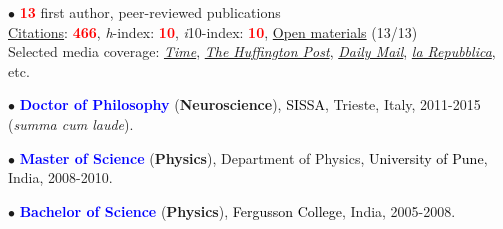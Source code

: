 \documentclass[10pt]{article}
\begin{document}
	
	

	
	$\bullet$ \textbf{\textcolor{red}{13}} first author, peer-reviewed publications\\
	\hspace*{0.1in}\href{https://scholar.google.it/citations?user=kSYuYTUAAAAJ&hl=en&oi=ao}{Citations}: \textbf{\textcolor{red}{466}}, \textit{h}-index: \textbf{\textcolor{red}{10}}, \textit{i}10-index: \textbf{\textcolor{red}{10}}, \href{https://osf.io/hk5f3/}{Open materials} (13/13)\\
	\hspace*{0.1in}Selected media coverage: \href{http://time.com/3242/driving-over-your-best-friend-its-the-right-thing-to-do/}{\textit{Time}}, \href{http://www.huffingtonpost.com/entry/autism-empathy-brain-research_us_56f92575e4b014d3fe237413}{\textit{The Huffington Post}}, \href{http://www.dailymail.co.uk/sciencetech/article-4308284/Virtual-reality-experiment-puts-altruism-test.html}{\textit{Daily Mail}}, \href{http://www.repubblica.it/scienze/2017/04/11/news/area_cervello_perdono-162669836/?rss}{\textit{la Repubblica}}, etc.

	
	$\bullet$ \textbf{\textcolor{blue}{Doctor of Philosophy}} (\textbf{Neuroscience}), \textcolor{black}{SISSA}, Trieste, Italy, 2011-2015 (\textit{summa cum laude}).\\ 
	 \miniskip
	
	$\bullet$ \textbf{\textcolor{blue}{Master of Science}} (\textbf{Physics}), Department of Physics, \textcolor{black}{University of Pune}, India, 2008-2010.\\%
	\miniskip
	
	$\bullet$ \textbf{\textcolor{blue}{Bachelor of Science}} (\textbf{Physics}), \textcolor{black}{Fergusson College}, India, 2005-2008.%
\end{document}
